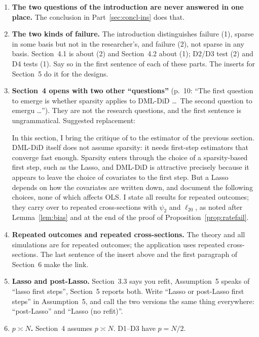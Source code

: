 \documentclass[11pt]{article}
\newenvironment{ins}{\begin{leftbar}}{\end{leftbar}}
\theoremstyle{plain}
\theoremstyle{remark}
\begin{document}
\begin{enumerate}
\item \textbf{The two questions of the introduction are never answered in one
  place.} The conclusion in Part~\ref{sec:concl-ins} does that.
\item \textbf{The two kinds of failure.} The introduction distinguishes failure
  (1), sparse in some basis but not in the researcher's, and failure (2), not
  sparse in any basis. Section~4.1 is about (2) and Section~4.2 about (1); D2/D3
  test (2) and D4 tests (1). Say so in the first sentence of each of these
  parts. The inserts for Section~5 do it for the designs.
\item \textbf{Section~4 opens with two other ``questions''} (p.~10: ``The first
  question to emerge is whether sparsity applies to DML-DiD \dots\ The second
  question to emergu \dots''). They are not the research questions, and the
  first sentence is ungrammatical. Suggested replacement:
\begin{ins}
In this section, I bring the critique of \textcite{kolesar2026fragility} to the
estimator of the previous section. DML-DiD itself does not assume sparsity: it
needs first-step estimators that converge fast enough. Sparsity enters through
the choice of a sparsity-based first step, such as the Lasso, and DML-DiD is
attractive precisely because it appears to leave the choice of covariates to
the first step. But a Lasso depends on how the covariates are written down, and
\textcite{kolesar2026fragility} document the following choices, none of which
affects OLS. I state all results for repeated outcomes; they carry over to
repeated cross-sections with $\psi_2$ and $\ell_{20}$, as noted after
Lemma~\ref{lem:bias} and at the end of the proof of Proposition~\ref{prop:ratefail}.
\end{ins}
\item \textbf{Repeated outcomes and repeated cross-sections.} The theory and all
  simulations are for repeated outcomes; the application uses repeated
  cross-sections. The last sentence of the insert above and the first paragraph
  of Section~6 make the link.
\item \textbf{Lasso and post-Lasso.} Section~3.3 says you refit, Assumption~5
  speaks of ``lasso first steps'', Section~5 reports both. Write ``Lasso or
  post-Lasso first steps'' in Assumption~5, and call the two versions the same
  thing everywhere: ``post-Lasso'' and ``Lasso (no refit)''.
\item \textbf{$p\asymp N$.} Section~4 assumes $p\asymp N$. D1--D3 have $p=N/2$.

\end{enumerate}
\end{document}
